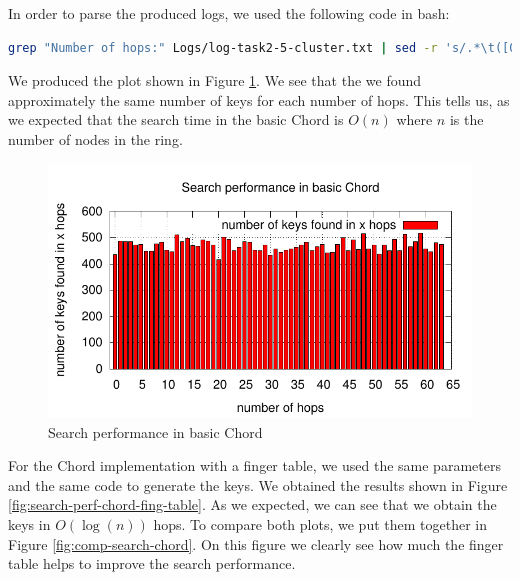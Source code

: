 \message{ !name(LSDS_project2_hayezl.tex)}\documentclass[a4paper, 11pt]{article}
\theoremstyle{plain}
\theoremstyle{definition}
\begin{document}
    

   
    In order to parse the produced logs, we used the following code in bash:
\begin{lstlisting}[style=luaCode, language=bash, caption=Parser for the logs]
grep "Number of hops:" Logs/log-task2-5-cluster.txt | sed -r 's/.*\t([0-9]{1,2})$/\1/g' | sort -n | uniq -c | sed -r 's/ +([0-9]+)/\2 \1/g' >> ParsedLogs/log-task2-5-cluster.txt
\end{lstlisting}
    
    We produced the plot shown in Figure \ref{fig:search-basic-chord}. We see that the we found approximately
    the same number of keys for each number of hops. This tells us, as we expected that the search time in the
    basic Chord is $O(n)$ where $n$ is the number of nodes in the ring. 


    \begin{figure}[h]
      \centering
      \includegraphics{plots/task2-2-cluster.pdf}
      \caption{Search performance in basic Chord}
      \label{fig:search-basic-chord}
    \end{figure}

    

    For the Chord implementation with a finger table, we used the same parameters and the same code to generate the keys. We
    obtained the results shown in Figure \ref{fig:search-perf-chord-fing-table}. As we expected, we can see
    that we obtain the keys in $O(\log(n))$ hops. To compare both plots, we put them together in Figure
    \ref{fig:comp-search-chord}. On this figure we clearly see how much the finger table helps to improve the
    search performance.
\end{document}

